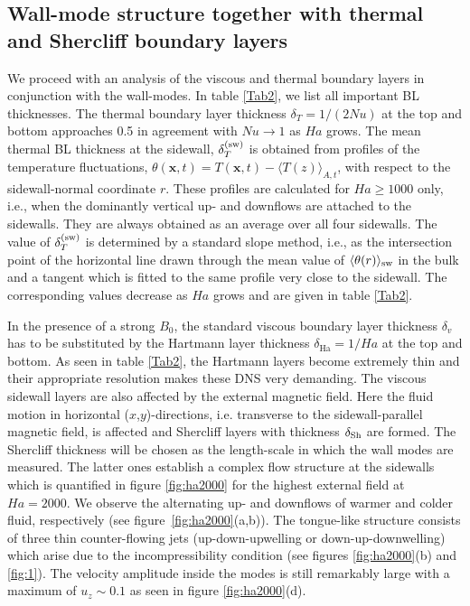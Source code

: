 \documentclass{jfm}
\begin{document}
\subsection{Wall-mode structure together with thermal and Shercliff boundary layers}
We proceed with an analysis of the viscous and thermal boundary layers in conjunction with the wall-modes. 
In table \ref{Tab2}, we list all important BL thicknesses. The thermal boundary layer thickness $\delta_T=1/(2 Nu)$
at the top and bottom approaches 0.5 in agreement with $Nu\to 1$ as $Ha$ grows. The mean thermal BL thickness 
at the sidewall, $\delta_T^{\rm (sw)}$ is obtained from profiles of the temperature fluctuations, $\theta({\bm x},t)=T({\bm x},t)
-\langle T(z)\rangle_{A,t}$, with respect to the sidewall-normal coordinate $r$. These profiles are calculated for $Ha\ge 1000$ 
only, i.e., when the dominantly vertical up- and downflows are attached to the sidewalls. They are always obtained as an 
average over all four sidewalls. The value of $\delta_T^{\rm (sw)}$ is determined by a standard slope method, 
i.e., as the intersection point of the horizontal line drawn through the mean value of $\langle \theta(r)\rangle_{\rm sw}$ in 
the bulk and a tangent which is fitted to the same profile very close to the sidewall. The corresponding values decrease as 
$Ha$ grows and are given in table \ref{Tab2}.
   
In the presence of a strong $B_0$, the standard viscous boundary layer thickness $\delta_v$ has to be substituted
by the Hartmann layer thickness $\delta_{\text{Ha}} = 1/Ha$ at the top and bottom. As seen in table \ref{Tab2},
the Hartmann layers become extremely thin and their appropriate resolution makes these DNS very demanding.
The viscous sidewall layers are also affected by the external magnetic field. Here the fluid motion in horizontal ($x$,$y$)-directions, 
i.e. transverse to the sidewall-parallel magnetic field, is affected and Shercliff layers with thickness $\delta_{\rm Sh}$ are formed. The Shercliff
thickness will be chosen as the length-scale in which the wall modes are measured. The latter ones establish
a complex flow structure at the sidewalls which is quantified in figure \ref{fig:ha2000} for the highest external field at $Ha=2000$.
We observe the alternating up- and downflows of warmer and colder fluid, respectively (see figure~\ref{fig:ha2000}(a,b)).
The tongue-like structure consists of three thin counter-flowing jets (up-down-upwelling or down-up-downwelling)
which arise due to the incompressibility condition (see figures \ref{fig:ha2000}(b) and \ref{fig:1}). The velocity
amplitude inside the modes is still remarkably large with a maximum of $u_z \sim 0.1$ as seen in figure \ref{fig:ha2000}(d).
\end{document}
